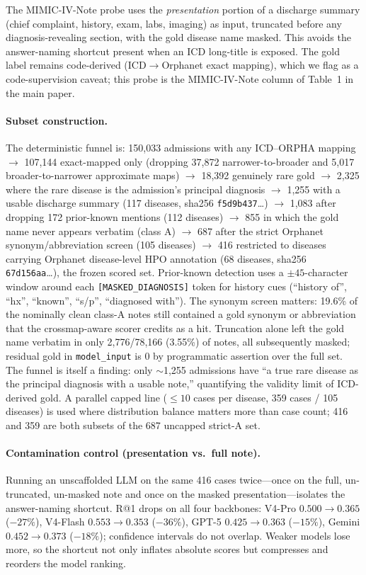 \documentclass[letterpaper]{article} %
\begin{document}
The MIMIC-IV-Note probe uses the \emph{presentation} portion of a discharge
summary (chief complaint, history, exam, labs, imaging) as input, truncated
before any diagnosis-revealing section, with the gold disease name masked. This
avoids the answer-naming shortcut present when an ICD long-title is exposed. The
gold label remains code-derived (ICD$\rightarrow$Orphanet exact mapping), which we
flag as a code-supervision caveat; this probe is the MIMIC-IV-Note column of
Table~1 in the main paper.

\paragraph{Subset construction.}
The deterministic funnel is: 150,033 admissions with any ICD--ORPHA mapping
$\rightarrow$ 107,144 exact-mapped only (dropping 37,872 narrower-to-broader and
5,017 broader-to-narrower approximate maps) $\rightarrow$ 18,392 genuinely rare
gold $\rightarrow$ 2,325 where the rare disease is the admission's principal
diagnosis $\rightarrow$ 1,255 with a usable discharge summary (117 diseases,
sha256 \texttt{f5d9b437}\ldots) $\rightarrow$ 1,083 after dropping 172
prior-known mentions (112 diseases) $\rightarrow$ 855 in which the gold name
never appears verbatim (class A) $\rightarrow$ 687 after the strict Orphanet
synonym/abbreviation screen (105 diseases) $\rightarrow$ 416 restricted to
diseases carrying Orphanet disease-level HPO annotation (68 diseases, sha256
\texttt{67d156aa}\ldots), the frozen scored set. Prior-known detection uses a
$\pm45$-character window around each \texttt{[MASKED\_DIAGNOSIS]} token for
history cues (``history of'', ``hx'', ``known'', ``s/p'', ``diagnosed with'').
The synonym screen matters: 19.6\% of the nominally clean class-A notes still
contained a gold synonym or abbreviation that the crossmap-aware scorer credits
as a hit. Truncation alone left the gold name verbatim in only 2,776/78,166
(3.55\%) of notes, all subsequently masked; residual gold in
\texttt{model\_input} is 0 by programmatic assertion over the full set. The
funnel is itself a finding: only $\sim$1,255 admissions have ``a true rare
disease as the principal diagnosis with a usable note,'' quantifying the
validity limit of ICD-derived gold. A parallel capped line (${\leq}10$ cases per
disease, 359 cases / 105 diseases) is used where distribution balance matters
more than case count; 416 and 359 are both subsets of the 687 uncapped
strict-A set.

\paragraph{Contamination control (presentation vs.\ full note).}
Running an unscaffolded LLM on the same 416 cases twice---once on the full,
un-truncated, un-masked note and once on the masked presentation---isolates the
answer-naming shortcut. R@1 drops on all four backbones:
V4-Pro $0.500\!\rightarrow\!0.365$ ($-27\%$), V4-Flash
$0.553\!\rightarrow\!0.353$ ($-36\%$), GPT-5 $0.425\!\rightarrow\!0.363$
($-15\%$), Gemini $0.452\!\rightarrow\!0.373$ ($-18\%$); confidence intervals do
not overlap. Weaker models lose more, so the shortcut not only inflates absolute
scores but compresses and reorders the model ranking.
\end{document}
